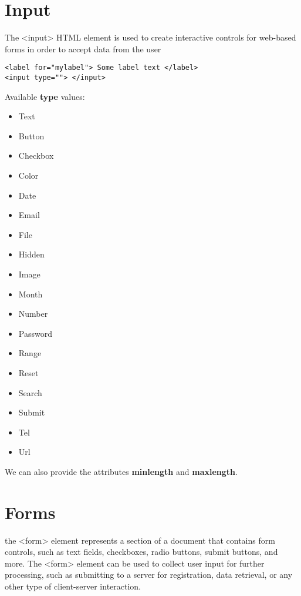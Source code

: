 \documentclass{report}
\begin{document}
    \pagebreak \bigbreak \noindent 
    \section{\LARGE Input}
    \bigbreak \noindent 
    The <input> HTML element is used to create interactive controls for web-based forms in order to accept data from the user
    \bigbreak \noindent 
    \sepline
    \begin{verbatim}
<label for="mylabel"> Some label text </label>
<input type=""> </input>
    \end{verbatim}
    \sepline
    \bigbreak \noindent 
    Available \textbf{type} values:
    \begin{itemize}
        \item Text
        \item Button
        \item Checkbox
        \item Color
        \item Date
        \item Email 
        \item File
        \item Hidden
        \item Image
        \item Month
        \item Number
        \item Password
        \item Range
        \item Reset 
        \item Search
        \item Submit
        \item Tel
        \item Url
    \end{itemize}
    \bigbreak \noindent 
    We can also provide the attributes \textbf{minlength} and \textbf{maxlength}.

    \pagebreak \bigbreak \noindent 
    \section{\LARGE Forms}
    \bigbreak \noindent 
    the <form> element represents a section of a document that contains form controls, such as text fields, checkboxes, radio buttons, submit buttons, and more. The <form> element can be used to collect user input for further processing, such as submitting to a server for registration, data retrieval, or any other type of client-server interaction.
\end{document}
